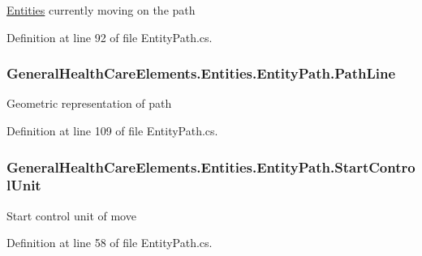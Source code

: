 \hyperlink{namespace_general_health_care_elements_1_1_entities}{Entities} currently moving on the path 



Definition at line 92 of file Entity\+Path.\+cs.

\subsubsection[{\texorpdfstring{Path\+Line}{PathLine}}]{ General\+Health\+Care\+Elements.\+Entities.\+Entity\+Path.\+Path\+Line\hspace{0.3cm}{\ttfamily [get]}}\hypertarget{class_general_health_care_elements_1_1_entities_1_1_entity_path_a2c43f7ce39c27c4c4f7a613bbbfb8acd}{}\label{class_general_health_care_elements_1_1_entities_1_1_entity_path_a2c43f7ce39c27c4c4f7a613bbbfb8acd}


Geometric representation of path 



Definition at line 109 of file Entity\+Path.\+cs.

\subsubsection[{\texorpdfstring{Start\+Control\+Unit}{StartControlUnit}}]{ General\+Health\+Care\+Elements.\+Entities.\+Entity\+Path.\+Start\+Control\+Unit\hspace{0.3cm}{\ttfamily [get]}}\hypertarget{class_general_health_care_elements_1_1_entities_1_1_entity_path_af4331d4301dd4f639971b27e91d53f3b}{}\label{class_general_health_care_elements_1_1_entities_1_1_entity_path_af4331d4301dd4f639971b27e91d53f3b}


Start control unit of move 



Definition at line 58 of file Entity\+Path.\+cs.

